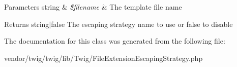 \begin{DoxyParams}[1]{Parameters}
string & {\em \$filename} & The template file name\\
\hline
\end{DoxyParams}
\begin{DoxyReturn}{Returns}
string$\vert$false The escaping strategy name to use or false to disable 
\end{DoxyReturn}


The documentation for this class was generated from the following file\+:\begin{DoxyCompactItemize}
\item 
vendor/twig/twig/lib/\+Twig/File\+Extension\+Escaping\+Strategy.\+php\end{DoxyCompactItemize}
